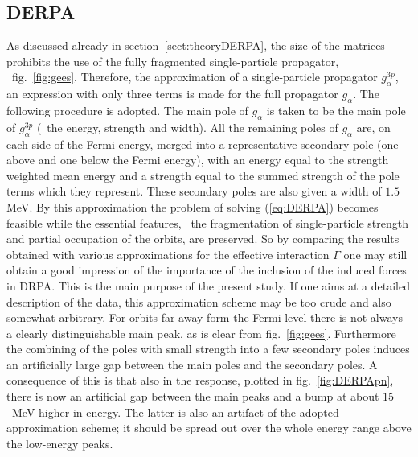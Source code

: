 \subsection{DERPA}
%
As discussed already in section~\ref{sect:theoryDERPA},
the size of the matrices prohibits the use of the fully fragmented 
single-particle propagator, \cf\ fig.~\ref{fig:gees}.
Therefore, the approximation of a single-particle propagator 
$g^{3p}_\alpha$, an expression with only three terms is made for the
full propagator $g_\alpha$.
The following procedure is adopted. The main pole of $g_\alpha$ is taken 
to be the main pole of $g^{3p}_\alpha$ (\ie\ the energy, strength and 
width). All the remaining poles of $g_\alpha$ are, on each side of the Fermi 
energy, merged into a representative secondary pole (one above and one below the 
Fermi energy), with an energy equal to the strength weighted mean energy 
and a strength equal to the summed strength of the pole terms which they 
represent. These secondary poles are also given a width of $1.5$ MeV. 
By this approximation the problem of solving (\ref{eq:DERPA}) becomes 
feasible while the essential features, \ie\ the fragmentation of 
single-particle strength and partial occupation of the orbits, are preserved. 
So by comparing the results obtained with various approximations for the 
effective interaction $\Gamma$ one may still obtain a good impression of the 
importance of the inclusion of the induced forces in DRPA. This is the main 
purpose of the present study. If one aims  at a detailed description of the 
data, this approximation scheme may be too crude and also somewhat arbitrary. 
For orbits far away form the Fermi level there is not always a clearly 
distinguishable main peak, as is clear from fig.~\ref{fig:gees}.
Furthermore the combining of the poles with small strength into a 
few secondary 
poles induces an artificially large gap between the main poles and 
the secondary 
poles. A consequence of this is that also in the response, plotted 
in fig.~\ref{fig:DERPApn}, there is now an artificial gap between the main 
peaks and a bump at about $15$~MeV higher in energy. The latter is also 
an artifact of the adopted approximation scheme; it should be spread out over 
the whole energy range above the low-energy peaks.

